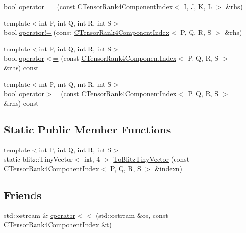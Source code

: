 \begin{DoxyCompactItemize}
\item 
bool \mbox{\hyperlink{classmpc_1_1core_1_1_c_tensor_rank4_component_index_aa2436baeda315fea3d87243dabd4048c}{operator==}} (const \mbox{\hyperlink{classmpc_1_1core_1_1_c_tensor_rank4_component_index}{C\+Tensor\+Rank4\+Component\+Index}}$<$ I, J, K, L $>$ \&rhs)
\item 
{\footnotesize template$<$int P, int Q, int R, int S$>$ }\\bool \mbox{\hyperlink{classmpc_1_1core_1_1_c_tensor_rank4_component_index_a50a6d03a48cd2e837009be3db14c1c16}{operator!=}} (const \mbox{\hyperlink{classmpc_1_1core_1_1_c_tensor_rank4_component_index}{C\+Tensor\+Rank4\+Component\+Index}}$<$ P, Q, R, S $>$ \&rhs)
\item 
{\footnotesize template$<$int P, int Q, int R, int S$>$ }\\bool \mbox{\hyperlink{classmpc_1_1core_1_1_c_tensor_rank4_component_index_ab351984f40d8478ff56a79c812c6c06e}{operator$<$=}} (const \mbox{\hyperlink{classmpc_1_1core_1_1_c_tensor_rank4_component_index}{C\+Tensor\+Rank4\+Component\+Index}}$<$ P, Q, R, S $>$ \&rhs) const
\item 
{\footnotesize template$<$int P, int Q, int R, int S$>$ }\\bool \mbox{\hyperlink{classmpc_1_1core_1_1_c_tensor_rank4_component_index_a630f35ebccdd18cce4b71aecc1df4936}{operator$>$=}} (const \mbox{\hyperlink{classmpc_1_1core_1_1_c_tensor_rank4_component_index}{C\+Tensor\+Rank4\+Component\+Index}}$<$ P, Q, R, S $>$ \&rhs) const
\end{DoxyCompactItemize}
\subsection*{Static Public Member Functions}
\begin{DoxyCompactItemize}
\item 
{\footnotesize template$<$int P, int Q, int R, int S$>$ }\\static blitz\+::\+Tiny\+Vector$<$ int, 4 $>$ \mbox{\hyperlink{classmpc_1_1core_1_1_c_tensor_rank4_component_index_a343c184dce33f03e52cecf4339f98894}{To\+Blitz\+Tiny\+Vector}} (const \mbox{\hyperlink{classmpc_1_1core_1_1_c_tensor_rank4_component_index}{C\+Tensor\+Rank4\+Component\+Index}}$<$ P, Q, R, S $>$ \&indexn)
\end{DoxyCompactItemize}
\subsection*{Friends}
\begin{DoxyCompactItemize}
\item 
std\+::ostream \& \mbox{\hyperlink{classmpc_1_1core_1_1_c_tensor_rank4_component_index_a12a969775470a7b9aefe06565a049f8b}{operator$<$$<$}} (std\+::ostream \&os, const \mbox{\hyperlink{classmpc_1_1core_1_1_c_tensor_rank4_component_index}{C\+Tensor\+Rank4\+Component\+Index}} \&t)
\end{DoxyCompactItemize}



